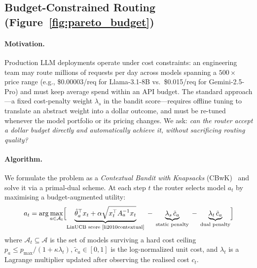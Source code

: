 
\subsection{Budget-Constrained Routing (Figure~\ref{fig:pareto_budget})}
\label{sec:budget_pacing}

\paragraph{Motivation.}
Production LLM deployments operate under cost constraints:
an engineering team may route millions of requests per day across
models spanning a $500\times$ price range
(e.g., \$0.00003/req for Llama-3.1-8B vs.\ \$0.015/req for Gemini-2.5-Pro)
and must keep average spend within an API budget.
The standard approach---a fixed cost-penalty weight $\lambda_s$ in the
bandit score---requires offline tuning to translate an abstract weight
into a dollar outcome, and must be re-tuned whenever the model portfolio
or its pricing changes.
We ask: \emph{can the router accept a dollar budget directly and
automatically achieve it, without sacrificing routing quality?}

\paragraph{Algorithm.}
We formulate the problem as a \emph{Contextual Bandit with Knapsacks}
(CBwK)~\cite{agrawal2014bandits} and solve it via a primal-dual scheme.
At each step $t$ the router selects model $a_t$ by maximising a
budget-augmented utility:
\begin{equation}
    a_t = \arg\max_{a \in \mathcal{A}_t} \Bigl[
        \underbrace{\hat\theta_a^\top x_t + \alpha \sqrt{x_t^\top A_a^{-1} x_t}}_{\text{LinUCB score~\cite{li2010contextual}}}
        \;-\; \underbrace{\lambda_s \,\tilde{c}_a}_{\text{static penalty}}
        \;-\; \underbrace{\lambda_t \,\tilde{c}_a}_{\text{dual penalty}}
    \Bigr]
    \label{eq:budget_ucb}
\end{equation}
where $\mathcal{A}_t \subseteq \mathcal{A}$ is the set of models
surviving a hard cost ceiling
$p_a \leq p_{\max}/(1 + \kappa\lambda_t)$,
$\tilde{c}_a \in [0,1]$ is the log-normalized unit cost,
and $\lambda_t$ is a Lagrange multiplier updated after observing the
realised cost $c_t$.

